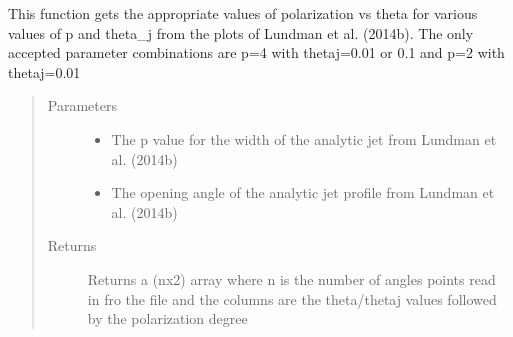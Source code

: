 \documentclass[letterpaper,10pt,english]{sphinxmanual}
\begin{document}
\begin{fulllineitems}
\label{\detokenize{read_process_files:read_process_files.get_lundman_pol_data}}
This function gets the appropriate values of polarization vs theta for various values of p and theta\_j from the
plots of Lundman et al. (2014b). The only accepted parameter combinations are p=4 with thetaj=0.01 or 0.1 and
p=2 with thetaj=0.01
\begin{quote}\begin{description}
\item[{Parameters}] \leavevmode\begin{itemize}
\item {} 
 \textendash{} The p value for the width of the analytic jet from Lundman et al. (2014b)

\item {} 
 \textendash{} The opening angle of the analytic jet profile from Lundman et al. (2014b)

\end{itemize}

\item[{Returns}] \leavevmode
Returns a (nx2) array where n is the number of angles points read in fro the file and the columns are the
theta/thetaj values followed by the polarization degree

\end{description}\end{quote}

\end{fulllineitems}

\end{document}
